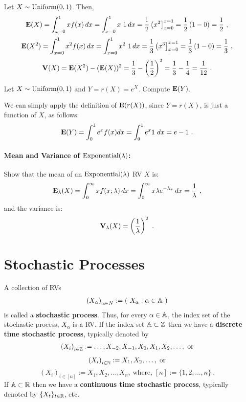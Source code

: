 \begin{example}
Let $X \sim \mbox{{\rm Uniform}}(0,1)$.  Then, 
\[
\mathbf{E}(X) = \int_{x=0}^1 x f(x)\, dx = \int_{x=0}^1 x \ 1 \, dx = \frac{1}{2} \left( x^2 \right]_{x=0}^{x=1} = \frac{1}{2} \left( 1-0 \right) = \frac{1}{2} \ ,
\]
\[
\mathbf{E}(X^2) = \int_{x=0}^1 x^2 f(x)\, dx = \int_{x=0}^1 x^2 \ 1 \, dx =  \frac{1}{3} \left( x^3 \right]_{x=0}^{x=1} = \frac{1}{3} \left( 1-0 \right) = \frac{1}{3} \ ,
\]
\[
\mathbf{V}(X) = \mathbf{E}(X^2) - (\mathbf{E}(X))^2 = \frac{1}{3}  - \left( \frac{1}{2} \right)^2  = \frac{1}{3}  - \frac{1}{4} = \frac{1}{12} \ .
\]
\end{example}

\begin{example}
Let $X \sim \mbox{{\rm Uniform}}(0,1)$ and $Y=r(X)=e^X$.  Compute $\mathbf{E}(Y)$. 

We can simply apply the definition of $\mathbf{E}(r(X))$, since $Y=r(X)$, is just a function of $X$, as follows: 
\[
\mathbf{E}(Y) = \int_0^1 e^x f(x) dx = \int_0^1 e^x 1 \ dx = e-1 \ .
\]
\end{example}

\paragraph{Mean and Variance of $\mbox{{\rm Exponential}}(\lambda)$:}
Show that the mean of an $\mbox{{\rm Exponential}}(\lambda)$ RV $X$ is:
\[
\mathbf{E}_{\lambda}(X) = \int_{0}^{\infty} x f(x;\lambda)\,dx
=   \int_{0}^{\infty} x \lambda e^{-\lambda x}\,dx
= \frac{1}{\lambda} \ ,
\]
and the variance is:
\[
\mathbf{V}_{\lambda}(X) = \left(  \frac{1}{\lambda} \right)^2 \ .
\]


\section{Stochastic Processes}\label{S:StochProc}

\begin{definition}
A collection of RVs  \[
\left(X_{\alpha} \right)_{\alpha \in N} := \left( \  X_{\alpha} : \alpha \in \mathbb{A} \  \right)
\]
is called a {\bf stochastic process}.  Thus, for every $\alpha \in  \mathbb{A}$, the index set of the stochastic process, $X_{\alpha}$ is a RV.  If the index set $ \mathbb{A}  \subset \mathbb{Z}$ then we have  a {\bf discrete time stochastic process}, typically denoted by 
\[
\left(X_i\right)_{i \in \mathbb{Z}} := \ldots, X_{-2},X_{-1},X_0, X_1,X_2,\ldots , \  \text{or}
\]
\[
\left( X_i \right)_{i \in \mathbb{N}} := X_1,X_2,\ldots , \  \text{or}
\]
\[
\left( X_i \right)_{i \in [n]} := X_1,X_2,\ldots , X_n , \ \text{where, } [n]:= \{1,2,\ldots,n\} \ .
\]
If $\mathbb{A} \subset \mathbb{R}$ then we have a {\bf continuous time stochastic process}, typically denoted by $\{X_t\}_{t \in \mathbb{R}}$, etc.  
\end{definition}

